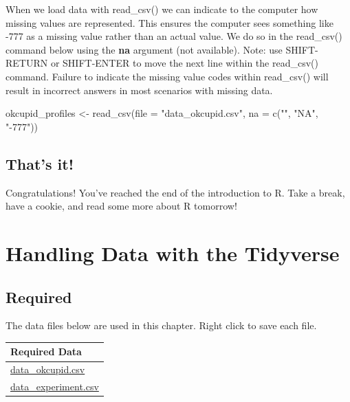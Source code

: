 \documentclass[
]{krantz}
\makeatletter
\newenvironment{Shaded}{\begin{snugshade}}{\end{snugshade}}
\newcommand{\AttributeTok}[1]{\textcolor[rgb]{0.61,0.61,0.61}{#1}}
\newcommand{\FunctionTok}[1]{\textcolor[rgb]{0,0,0}{#1}}
\newcommand{\NormalTok}[1]{#1}
\newcommand{\OtherTok}[1]{\textcolor[rgb]{0.37,0.37,0.37}{#1}}
\newcommand{\StringTok}[1]{\textcolor[rgb]{0.5,0.5,0.5}{#1}}
\newenvironment{kframe}{%
\medskip{}
\setlength{\fboxsep}{.8em}
 \def\at@end@of@kframe{}%
 \ifinner\ifhmode%
  \def\at@end@of@kframe{\end{minipage}}%
  \begin{minipage}{\columnwidth}%
 \fi\fi%
 \def\FrameCommand##1{\hskip\@totalleftmargin \hskip-\fboxsep
 \colorbox{shadecolor}{##1}\hskip-\fboxsep
     \hskip-\linewidth \hskip-\@totalleftmargin \hskip\columnwidth}%
 \MakeFramed {\advance\hsize-\width
   \@totalleftmargin\z@ \linewidth\hsize
   \@setminipage}}%
 {\par\unskip\endMakeFramed%
 \at@end@of@kframe}
\renewenvironment{Shaded}{\begin{kframe}}{\end{kframe}}
\makeatother
\begin{document}
When we load data with read\_csv() we can indicate to the computer how missing values are represented. This ensures the computer sees something like -777 as a missing value rather than an actual value. We do so in the read\_csv() command below using the \textbf{na} argument (not available). Note: use SHIFT-RETURN or SHIFT-ENTER to move the next line within the read\_csv() command. Failure to indicate the missing value codes within read\_csv() will result in incorrect answers in most scenarios with missing data.

\begin{Shaded}
\begin{Highlighting}[]
\NormalTok{okcupid\_profiles }\OtherTok{\textless{}{-}} \FunctionTok{read\_csv}\NormalTok{(}\AttributeTok{file =} \StringTok{"data\_okcupid.csv"}\NormalTok{,}
                             \AttributeTok{na =} \FunctionTok{c}\NormalTok{(}\StringTok{""}\NormalTok{, }\StringTok{"NA"}\NormalTok{, }\StringTok{"{-}777"}\NormalTok{))}
\end{Highlighting}
\end{Shaded}

\hypertarget{thats-it}{%
\section{That's it!}\label{thats-it}}

Congratulations! You've reached the end of the introduction to R. Take a break, have a cookie, and read some more about R tomorrow!

\hypertarget{handling-data-with-the-tidyverse}{%
\chapter{Handling Data with the Tidyverse}\label{handling-data-with-the-tidyverse}}

\hypertarget{required}{%
\section{Required}\label{required}}

The data files below are used in this chapter. Right click to save each file.

\begin{longtable}[]{@{}l@{}}
\toprule
Required Data \\
\midrule
\endhead
\url{data_okcupid.csv} \\
\url{data_experiment.csv} \\
\bottomrule
\end{longtable}
\end{document}
